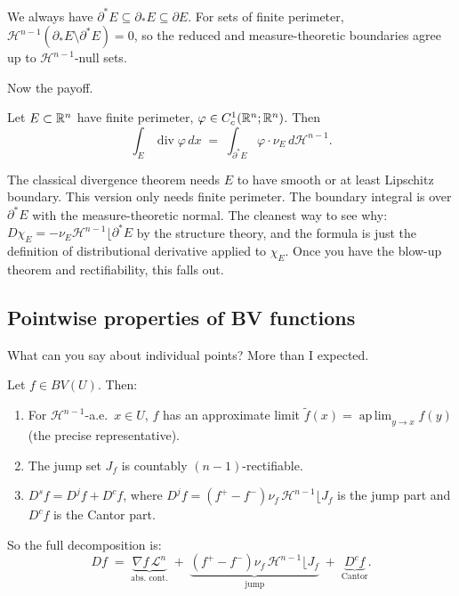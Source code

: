 We always have $\partial^* E \subseteq \partial_* E \subseteq \partial E$. For sets of finite perimeter, $\mathcal{H}^{n-1}(\partial_* E \setminus \partial^* E) = 0$, so the reduced and measure-theoretic boundaries agree up to $\mathcal{H}^{n-1}$-null sets.

Now the payoff.

\begin{theorem}\label{thm:gauss-green}
Let $E \subset \mathbb{R}^n$ have finite perimeter, $\varphi \in C_c^1(\mathbb{R}^n; \mathbb{R}^n)$. Then
\[
  \int_E \operatorname{div}\varphi\, dx \;=\; \int_{\partial^* E} \varphi \cdot \nu_E \, d\mathcal{H}^{n-1}.
\]
\end{theorem}

The classical divergence theorem needs $E$ to have smooth or at least Lipschitz boundary. This version only needs finite perimeter. The boundary integral is over $\partial^* E$ with the measure-theoretic normal. The cleanest way to see why: $D\chi_E = -\nu_E \mathcal{H}^{n-1} \lfloor \partial^* E$ by the structure theory, and the formula is just the definition of distributional derivative applied to $\chi_E$. Once you have the blow-up theorem and rectifiability, this falls out.

\subsection{Pointwise properties of BV functions}\label{subsec:pointwise}

What can you say about individual points? More than I expected.

\begin{theorem}\label{thm:pointwise-bv}
Let $f \in BV(U)$. Then:
\begin{enumerate}
  \item For $\mathcal{H}^{n-1}$-a.e.\ $x \in U$, $f$ has an approximate limit $\tilde{f}(x) = \operatorname{ap\,lim}_{y \to x} f(y)$ (the precise representative).
  \item The jump set $J_f$ is countably $(n-1)$-rectifiable.
  \item $D^s f = D^j f + D^c f$, where $D^j f = (f^+ - f^-) \nu_f \, \mathcal{H}^{n-1} \lfloor J_f$ is the jump part and $D^c f$ is the Cantor part.
\end{enumerate}
\end{theorem}

So the full decomposition is:
\[
  Df \;=\; \underbrace{\nabla f \, \mathcal{L}^n}_{\text{abs.\ cont.}} \;+\; \underbrace{(f^+ - f^-)\nu_f \, \mathcal{H}^{n-1}\lfloor J_f}_{\text{jump}} \;+\; \underbrace{D^c f}_{\text{Cantor}}.
\]


